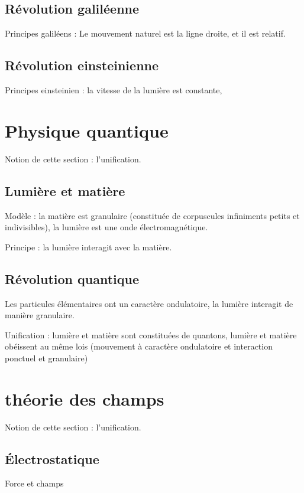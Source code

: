     \subsection{Révolution galiléenne}

Principes galiléens : Le mouvement naturel est la ligne droite, et il est relatif.

    \subsection{Révolution einsteinienne}

Principes einsteinien : la vitesse de la lumière est constante, 

\section{Physique quantique}

Notion de cette section : l'unification.

  \subsection{Lumière et matière}

Modèle : la matière est granulaire (constituée de corpuscules infiniments petits et indivisibles), la lumière est une onde électromagnétique.

Principe : la lumière interagit avec la matière.


  \subsection{Révolution quantique}

Les particules élémentaires ont un caractère ondulatoire, la lumière interagit de manière granulaire.

Unification : lumière et matière sont constituées de quantons, lumière et matière obéissent au même lois (mouvement à caractère ondulatoire et interaction ponctuel et granulaire)

\section{théorie des champs}

Notion de cette section : l'unification.

    \subsection{Électrostatique}
Force et champs
